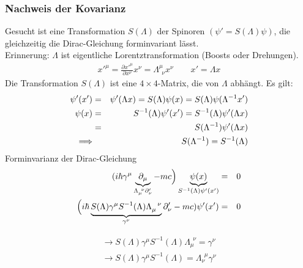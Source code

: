 \subsubsection{Nachweis der Kovarianz}
Gesucht ist eine Transformation $S(\Lambda)$ der Spinoren $(\psi' = S(\Lambda)\psi)$, die gleichzeitig die Dirac-Gleichung forminvariant lässt.\\
Erinnerung: $\Lambda$ ist eigentliche Lorentztransformation (Boosts oder Drehungen).
\begin{eqnarray*}
x'^{\mu} = \frac{\partial x'^{\mu}}{\partial x^{\nu}} x^{\nu}  = \Lambda^{\mu}_{\ \ \nu} x^{\nu} \qquad x' = \Lambda x
\end{eqnarray*}
Die Transformation $S(\Lambda)$ ist eine $4\times4$-Matrix, die von $\Lambda$ abhängt. Es gilt:
\begin{eqnarray*}
\psi'(x') &=& \psi'(\Lambda x) = S(\Lambda) \psi(x) = S(\Lambda)\psi(\Lambda^{-1}x')\\
\psi(x) &=& S^{-1}(\Lambda) \psi'(x') = S^{-1}(\Lambda)\psi'(\Lambda x)\\
&=& S(\Lambda^{-1}) \psi'(\Lambda x)\\
\Longrightarrow &{}& S(\Lambda^{-1}) = S^{-1} (\Lambda)
\end{eqnarray*}
Forminvarianz der Dirac-Gleichung
\begin{eqnarray*}
(i\hbar\gamma^{\mu} \underbrace{\partial_{\mu}}_{\Lambda_{\mu}^{\;\,\nu}\partial_{\nu}'} - m c\Big) \underbrace{\psi(x)}_{S^{-1}(\Lambda)\psi'(x')} \g 0\\
\Big( i \hbar \underbrace{S(\Lambda) \gamma^{\mu}S^{-1}(\Lambda)\Lambda_{\mu}^{\ \ \nu}}_{\gamma^{\nu}}\partial_{\nu}' - m c) \psi'(x')\g 0 
\end{eqnarray*}

\begin{gather}\label{eq:5a}
\rightarrow \boxed{S(\Lambda) \gamma^{\mu}S^{-1}(\Lambda)\Lambda_{\mu}^{\;\,\nu} = \gamma^{\nu}} \tag{5a} \\ \label{eq:5b}
\rightarrow \boxed{ S(\Lambda)\gamma^{\mu}S^{-1}(\Lambda) = \Lambda_{\nu}^{\ \ \mu}\gamma^{\nu}} \tag{5b}
\end{gather}

